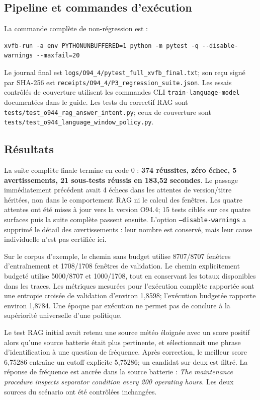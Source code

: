 \documentclass[11pt,a4paper]{article}
\begin{document}
\subsection{Pipeline et commandes d'exécution}
La commande complète de non-régression est :
\begin{verbatim}
xvfb-run -a env PYTHONUNBUFFERED=1 python -m pytest -q --disable-warnings --maxfail=20
\end{verbatim}
Le journal final est \texttt{logs/O94\_4/pytest\_full\_xvfb\_final.txt}; son reçu signé par SHA-256 est \texttt{receipts/O94\_4/P3\_regression\_suite.json}. Les essais contrôlés de couverture utilisent les commandes CLI \texttt{train-language-model} documentées dans le guide. Les tests du correctif RAG sont \texttt{tests/test\_o944\_rag\_answer\_intent.py}; ceux de couverture sont \texttt{tests/test\_o944\_language\_window\_policy.py}.

\subsection{Résultats}
La suite complète finale termine en code 0 : \textbf{374 réussites, zéro échec, 5 avertissements, 21 sous-tests réussis en 183,52 secondes}. Le passage immédiatement précédent avait 4 échecs dans les attentes de version/titre héritées, non dans le comportement RAG ni le calcul des fenêtres. Les quatre attentes ont été mises à jour vers la version O94.4; 15 tests ciblés sur ces quatre surfaces puis la suite complète passent ensuite. L'option \texttt{--disable-warnings} a supprimé le détail des avertissements : leur nombre est conservé, mais leur cause individuelle n'est pas certifiée ici.

Sur le corpus d'exemple, le chemin sans budget utilise 8707/8707 fenêtres d'entraînement et 1708/1708 fenêtres de validation. Le chemin explicitement budgeté utilise 5000/8707 et 1000/1708, tout en conservant les totaux disponibles dans les traces. Les métriques mesurées pour l'exécution complète rapportée sont une entropie croisée de validation d'environ 1,8598; l'exécution budgetée rapporte environ 1,8784. Une époque par exécution ne permet pas de conclure à la supériorité universelle d'une politique.

Le test RAG initial avait retenu une source météo éloignée avec un score positif alors qu'une source batterie était plus pertinente, et sélectionnait une phrase d'identification à une question de fréquence. Après correction, le meilleur score 6,75286 entraîne un cutoff explicite 5,75286; un candidat sur deux est filtré. La réponse de fréquence est ancrée dans la source batterie : \emph{The maintenance procedure inspects separator condition every 200 operating hours.} Les deux sources du scénario ont été contrôlées inchangées.
\end{document}
